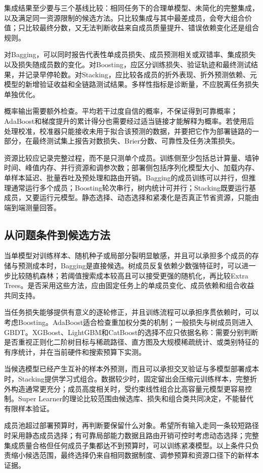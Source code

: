 集成结果至少要与三个基线比较：相同任务下的合理单模型、未简化的完整集成，以及满足同一资源限制的候选方法。只比较集成与其中最差成员，会夸大组合价值；只比较最终分数，又无法判断收益来自成员质量提升、错误依赖变化还是组合规则。

对Bagging，可以同时报告代表性单成员损失、成员预测相关或双错率、集成损失以及损失随成员数的变化。对Boosting，应区分训练损失、验证轨迹和最终测试结果，并记录早停轮数。对Stacking，应比较各成员的折外表现、折外预测依赖、元模型的新增验证收益和全链路测试结果。多样性指标是诊断量，不应脱离任务损失单独优化。

概率输出需要额外检查。平均若干过度自信的概率，不保证得到可靠概率；AdaBoost和梯度提升的累计得分也需要经过适当链接才能解释为概率。若使用后处理校准，校准器只能接收未用于拟合该预测的数据，并要把它作为部署链路的一部分，在最终测试集上报告对数损失、Brier分数、可靠性及任务决策损失。

资源比较应记录完整过程，而不是只测单个成员。训练侧至少包括总计算量、墙钟时间、峰值内存、并行资源和调参次数；部署侧包括序列化模型大小、加载内存、单样本延迟、批量吞吐及预处理和路由开销。Bagging的成员训练可以并行，但推理通常运行多个成员；Boosting轮次串行，树内统计可并行；Stacking既要运行基成员，又要运行元模型。静态选择、动态选择和紧凑化是否真正节省资源，只能由端到端测量回答。

\subsection{从问题条件到候选方法}
\label{sec:ensemble-method-selection}

当单模型对训练样本、随机种子或局部分裂明显敏感，并且可以承担多个成员的存储与预测成本时，Bagging是直接候选。树成员反复依赖少数强特征时，可以进一步比较随机森林；若阈值搜索成本较高且可以接受更强的随机化，再比较Extra Trees。是否采用这些方法，应由固定任务上的单成员变化、成员依赖和组合收益共同支持。

当任务损失能够提供有意义的逐轮修正，并且训练流程可以承担序贯依赖时，可以考虑Boosting。AdaBoost适合检查重加权分类的机制；一般损失与树成员则进入GBDT。XGBoost、LightGBM和CatBoost的选择不应只依据名称：需要分别判断是否重视正则化二阶树目标与稀疏路径、直方图及大规模稀疏统计、或类别特征的有序统计，并在当前硬件和搜索预算下实测。

当候选模型已经产生互补的样本外预测，而且可以承担交叉验证与多模型部署成本时，Stacking提供学习式组合。数据较少时，固定留出会压缩元训练样本，完整折外构造通常更充分；成员高度相关时，受约束线性组合比高容量元模型更容易控制。Super Learner的理论比较范围由候选库、损失和组合类共同决定，不能替代有限样本验证。

成员池超过部署预算时，再判断要保留什么对象。希望所有输入走同一条较短路径时采用静态成员选择；有可靠局部能力数据且路由开销可控时考虑动态选择；完整集成质量合格但任何成员子集都达不到预算时，可以训练紧凑模型。以上条件只负责缩小候选范围，最终选择仍来自相同数据制度、调参预算和资源口径下的新样本证据。
